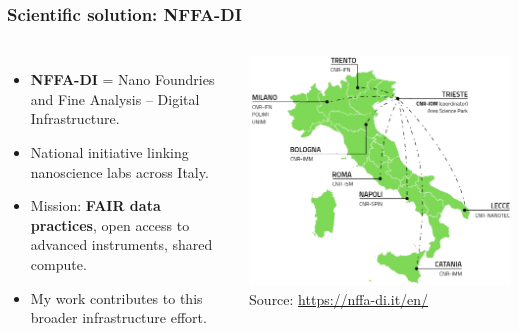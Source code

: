 \documentclass{beamer}
\begin{document}
	\begin{frame}
		\frametitle{Scientific solution: NFFA-DI}
		\begin{columns}[T,totalwidth=\textwidth]
			\begin{itemize}
				\item \textbf{NFFA-DI} = Nano Foundries and Fine Analysis – Digital Infrastructure.
				\item National initiative linking nanoscience labs across Italy.
				\item Mission: \textbf{FAIR data practices}, open access to advanced instruments, shared compute.
				\item My work contributes to this broader infrastructure effort.
			\end{itemize}
			\includegraphics[width=\linewidth]{otherResources/NFFA_map.png}
			\vspace{1em}
			\tiny Source: \url{https://nffa-di.it/en/}
		\end{columns}
	\end{frame}
	
\end{document}
